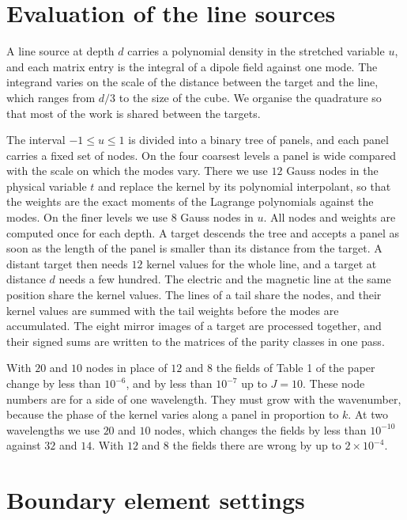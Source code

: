 \documentclass[preprint,11pt]{elsarticle}
\begin{document}
\section{Evaluation of the line sources}
\label{sup:lines}

A line source at depth $d$ carries a polynomial density in the stretched variable $u$, and each matrix entry is the integral of a dipole field against one mode. The integrand varies on the scale of the distance between the target and the line, which ranges from $d/3$ to the size of the cube. We organise the quadrature so that most of the work is shared between the targets.

The interval $-1\le u\le1$ is divided into a binary tree of panels, and each panel carries a fixed set of nodes. On the four coarsest levels a panel is wide compared with the scale on which the modes vary. There we use $12$ Gauss nodes in the physical variable $t$ and replace the kernel by its polynomial interpolant, so that the weights are the exact moments of the Lagrange polynomials against the modes. On the finer levels we use $8$ Gauss nodes in $u$. All nodes and weights are computed once for each depth. A target descends the tree and accepts a panel as soon as the length of the panel is smaller than its distance from the target. A distant target then needs $12$ kernel values for the whole line, and a target at distance $d$ needs a few hundred. The electric and the magnetic line at the same position share the kernel values. The lines of a tail share the nodes, and their kernel values are summed with the tail weights before the modes are accumulated. The eight mirror images of a target are processed together, and their signed sums are written to the matrices of the parity classes in one pass.

With $20$ and $10$ nodes in place of $12$ and $8$ the fields of Table 1 of the paper change by less than $10^{-6}$, and by less than $10^{-7}$ up to $J = 10$. These node numbers are for a side of one wavelength. They must grow with the wavenumber, because the phase of the kernel varies along a panel in proportion to $k$. At two wavelengths we use $20$ and $10$ nodes, which changes the fields by less than $10^{-10}$ against $32$ and $14$. With $12$ and $8$ the fields there are wrong by up to $2\times10^{-4}$.

\section{Boundary element settings}
\label{sup:bempp}
\end{document}
